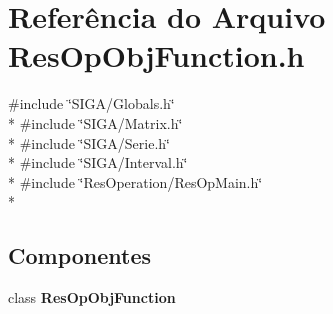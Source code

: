 \section{Referência do Arquivo Res\+Op\+Obj\+Function.\+h}
\label{_obj_function_2_res_op_obj_function_8h}
{\ttfamily \#include \char`\"{}S\+I\+G\+A/\+Globals.\+h\char`\"{}}\\*
{\ttfamily \#include \char`\"{}S\+I\+G\+A/\+Matrix.\+h\char`\"{}}\\*
{\ttfamily \#include \char`\"{}S\+I\+G\+A/\+Serie.\+h\char`\"{}}\\*
{\ttfamily \#include \char`\"{}S\+I\+G\+A/\+Interval.\+h\char`\"{}}\\*
{\ttfamily \#include \char`\"{}Res\+Operation/\+Res\+Op\+Main.\+h\char`\"{}}\\*
\subsection*{Componentes}
\begin{DoxyCompactItemize}
\item 
class {\bf Res\+Op\+Obj\+Function}
\end{DoxyCompactItemize}
